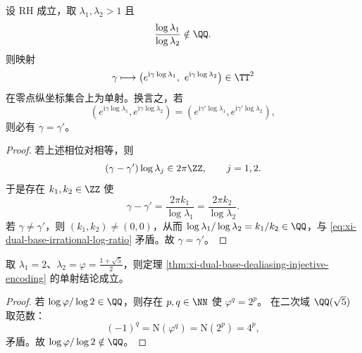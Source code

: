 \begin{theorem}[双基数去混叠的相位注入编码]\label{thm:xi-dual-base-dealiasing-injective-encoding}
设 RH 成立，取 \(\lambda_1,\lambda_2>1\) 且
\begin{equation}\label{eq:xi-dual-base-irrational-log-ratio}
\frac{\log\lambda_1}{\log\lambda_2}\notin\QQ.
\end{equation}
则映射
\[
\gamma\longmapsto
\left(e^{\mathrm{i}\gamma\log\lambda_1},\ e^{\mathrm{i}\gamma\log\lambda_2}\right)\in\TT^2
\]
在零点纵坐标集合上为单射。换言之，若
\[
\left(e^{\mathrm{i}\gamma\log\lambda_1},e^{\mathrm{i}\gamma\log\lambda_2}\right)
=
\left(e^{\mathrm{i}\gamma'\log\lambda_1},e^{\mathrm{i}\gamma'\log\lambda_2}\right),
\]
则必有 \(\gamma=\gamma'\)。
\end{theorem}
\begin{proof}
若上述相位对相等，则
\[
(\gamma-\gamma')\log\lambda_j\in 2\pi\ZZ,\qquad j=1,2.
\]
于是存在 \(k_1,k_2\in\ZZ\) 使
\[
\gamma-\gamma'
=\frac{2\pi k_1}{\log\lambda_1}
=\frac{2\pi k_2}{\log\lambda_2}.
\]
若 \(\gamma\neq\gamma'\)，则 \((k_1,k_2)\neq(0,0)\)，从而
\(
\log\lambda_1/\log\lambda_2=k_1/k_2\in\QQ
\)，与 \eqref{eq:xi-dual-base-irrational-log-ratio} 矛盾。故 \(\gamma=\gamma'\)。
\end{proof}

\begin{corollary}\label{cor:xi-dual-base-dealiasing-2-phi}
取 \(\lambda_1=2\)、\(\lambda_2=\varphi=\frac{1+\sqrt5}{2}\)，则定理
\ref{thm:xi-dual-base-dealiasing-injective-encoding} 的单射结论成立。
\end{corollary}
\begin{proof}
若 \(\log\varphi/\log2\in\QQ\)，则存在 \(p,q\in\NN\) 使 \(\varphi^q=2^p\)。
在二次域 \(\QQ(\sqrt5)\) 取范数：
\[
(-1)^q=\mathrm N(\varphi^q)=\mathrm N(2^p)=4^p,
\]
矛盾。故 \(\log\varphi/\log2\notin\QQ\)。
\end{proof}

